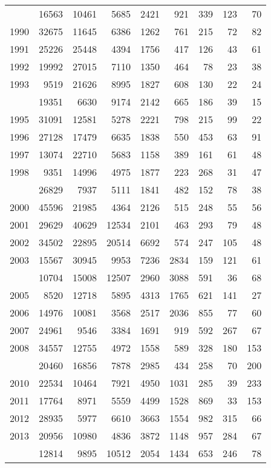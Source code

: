 \documentclass[
]{article}
\begin{document}
\begin{longtable}[t]{lrrrrrrrr}
\endfoot
\bottomrule
\endlastfoot
1989 & 16563 & 10461 & 5685 & 2421 & 921 & 339 & 123 & 70\\
1990 & 32675 & 11645 & 6386 & 1262 & 761 & 215 & 72 & 82\\
1991 & 25226 & 25448 & 4394 & 1756 & 417 & 126 & 43 & 61\\
1992 & 19992 & 27015 & 7110 & 1350 & 464 & 78 & 23 & 38\\
1993 & 9519 & 21626 & 8995 & 1827 & 608 & 130 & 22 & 24\\
\addlinespace
1994 & 19351 & 6630 & 9174 & 2142 & 665 & 186 & 39 & 15\\
1995 & 31091 & 12581 & 5278 & 2221 & 798 & 215 & 99 & 22\\
1996 & 27128 & 17479 & 6635 & 1838 & 550 & 453 & 63 & 91\\
1997 & 13074 & 22710 & 5683 & 1158 & 389 & 161 & 61 & 48\\
1998 & 9351 & 14996 & 4975 & 1877 & 223 & 268 & 31 & 47\\
\addlinespace
1999 & 26829 & 7937 & 5111 & 1841 & 482 & 152 & 78 & 38\\
2000 & 45596 & 21985 & 4364 & 2126 & 515 & 248 & 55 & 56\\
2001 & 29629 & 40629 & 12534 & 2101 & 463 & 293 & 79 & 48\\
2002 & 34502 & 22895 & 20514 & 6692 & 574 & 247 & 105 & 48\\
2003 & 15567 & 30945 & 9953 & 7236 & 2834 & 159 & 121 & 61\\
\addlinespace
2004 & 10704 & 15008 & 12507 & 2960 & 3088 & 591 & 36 & 68\\
2005 & 8520 & 12718 & 5895 & 4313 & 1765 & 621 & 141 & 27\\
2006 & 14976 & 10081 & 3568 & 2517 & 2036 & 855 & 77 & 60\\
2007 & 24961 & 9546 & 3384 & 1691 & 919 & 592 & 267 & 67\\
2008 & 34557 & 12755 & 4972 & 1558 & 589 & 328 & 180 & 153\\
\addlinespace
2009 & 20460 & 16856 & 7878 & 2985 & 434 & 258 & 70 & 200\\
2010 & 22534 & 10464 & 7921 & 4950 & 1031 & 285 & 39 & 233\\
2011 & 17764 & 8971 & 5559 & 4499 & 1528 & 869 & 33 & 153\\
2012 & 28935 & 5977 & 6610 & 3663 & 1554 & 982 & 315 & 66\\
2013 & 20956 & 10980 & 4836 & 3872 & 1148 & 957 & 284 & 67\\
\addlinespace
2014 & 12814 & 9895 & 10512 & 2054 & 1434 & 653 & 246 & 78\\

\end{longtable}
\end{document}
